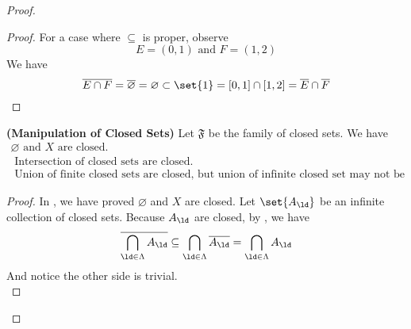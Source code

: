 \documentclass{report}
\begin{document}
\begin{proof}
\begin{proof}
For a case where $\subseteq $ is proper, observe
\begin{equation}
E=(0,1)\text{ and }F=(1,2)
\end{equation}
We have
\begin{equation}
\overline{E\cap F}=\overline{\varnothing}=\varnothing \subset \set{1}=[0,1]\cap [1,2]=\overline{E}\cap \overline{F}
\end{equation}
\end{proof}
\begin{theorem}
\label{3.2.5}
\textbf{(Manipulation of Closed Sets)} Let $\mathfrak{F}$ be the family of closed sets. We have
\begin{gather}
\varnothing\text{ and }X\text{ are closed. }\\
\text{ Intersection of closed sets are closed. }\\
\text{ Union of finite closed sets are closed, but union of infinite closed set may not be closed. }
\end{gather}
\end{theorem}
\begin{proof}
In , we have proved $\varnothing$ and $X$ are closed. Let $\set{A_\ld}$ be an infinite collection of closed sets. Because $A_\ld $ are closed, by , we have
\begin{equation}
\overline{\bigcap_{\ld  \in \Lambda }A_\ld }\subseteq \bigcap _{\ld \in\Lambda }\overline{A_\ld }=\bigcap _{\ld \in\Lambda }A_\ld 
\end{equation}
And notice the other side is trivial.\\


\end{proof}
\end{proof}
\end{document}
